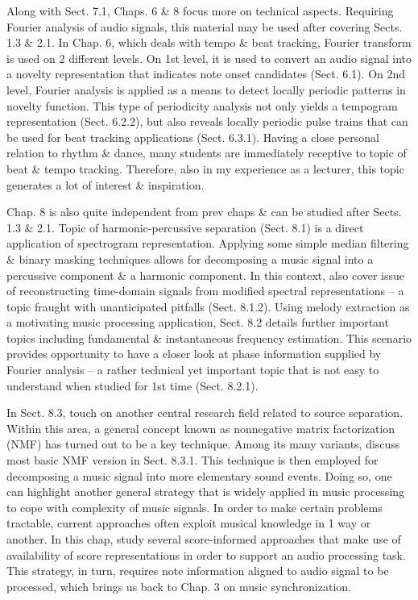 \documentclass{article}
\begin{document}
\begin{itemize}
\begin{itemize}
		Along with Sect. 7.1, Chaps. 6 \& 8 focus more on technical aspects. Requiring Fourier analysis of audio signals, this material may be used after covering Sects. 1.3 \& 2.1. In Chap. 6, which deals with tempo \& beat tracking, Fourier transform is used on 2 different levels. On 1st level, it is used to convert an audio signal into a novelty representation that indicates note onset candidates (Sect. 6.1). On 2nd level, Fourier analysis is applied as a means to detect locally periodic patterns in novelty function. This type of periodicity analysis not only yields a tempogram representation (Sect. 6.2.2), but also reveals locally periodic pulse trains that can be used for beat tracking applications (Sect. 6.3.1). Having a close personal relation to rhythm \& dance, many students are immediately receptive to topic of beat \& tempo tracking. Therefore, also in my experience as a lecturer, this topic generates a lot of interest \& inspiration.
		
		Chap. 8 is also quite independent from prev chaps \& can be studied after Sects. 1.3 \& 2.1. Topic of harmonic-percussive separation (Sect. 8.1) is a direct application of spectrogram representation. Applying some simple median filtering \& binary masking techniques allows for decomposing a music signal into a percussive component \& a harmonic component. In this context, also cover issue of reconstructing time-domain signals from modified spectral representations -- a topic fraught with unanticipated pitfalls (Sect. 8.1.2). Using melody extraction as a motivating music processing application, Sect. 8.2 details further important topics including fundamental \& instantaneous frequency estimation. This scenario provides opportunity to have a closer look at phase information supplied by Fourier analysis -- a rather technical yet important topic that is not easy to understand when studied for 1st time (Sect. 8.2.1).
		
		In Sect. 8.3, touch on another central research field related to source separation. Within this area, a general concept known as nonnegative matrix factorization (NMF) has turned out to be a key technique. Among its many variants, discuss most basic NMF version in Sect. 8.3.1. This technique is then employed for decomposing a music signal into more elementary sound events. Doing so, one can highlight another general strategy that is widely applied in music processing to cope with complexity of music signals. In order to make certain problems tractable, current approaches often exploit musical knowledge in 1 way or another. In this chap, study several score-informed approaches that make use of availability of score representations in order to support an audio processing task. This strategy, in turn, requires note information aligned to audio signal to be processed, which brings us back to Chap. 3 on music synchronization.
		

\end{itemize}
\end{itemize}
\end{document}
